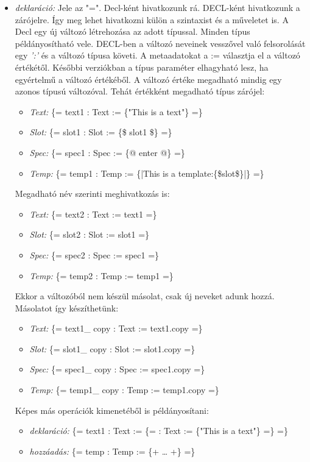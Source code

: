 \begin{itemize}
\item \emph{deklaráció:} 
Jele az "=".
Decl-ként hivatkozunk rá.
DECL-ként hivatkozunk a zárójelre.
Így meg lehet hivatkozni külön a szintaxist és a műveletet is.
A Decl egy új változó létrehozása az adott típussal.
Minden típus példányosítható vele.
DECL-ben a változó neveinek vesszővel való felsorolását egy \textit{':'} és a változó típusa követi. 
A metaadatokat a := választja el a változó értékétől.
Későbbi verziókban a típus paraméter elhagyható lesz, ha egyértelmű a változó értékéből. 
A változó értéke megadható mindig egy azonos típusú változóval.
Tehát értékként megadható típus zárójel:
\begin{itemize}
\item\emph{Text:} \{= text1 : Text := \{"This is a text"\} =\}
\item\emph{Slot:} \{= slot1 : Slot := \{\$ slot1 \$\} =\}
\item\emph{Spec:} \{= spec1 : Spec := \{@ enter @\} =\}
\item\emph{Temp:} \{= temp1 : Temp := \{|This is a template:\{\$slot\$\}|\} =\}
\end{itemize}
Megadható név szerinti meghivatkozás is:
\begin{itemize}
\item\emph{Text:} \{= text2 : Text := text1 =\}
\item\emph{Slot:} \{= slot2 : Slot := slot1 =\}
\item\emph{Spec:} \{= spec2 : Spec := spec1 =\}
\item\emph{Temp:} \{= temp2 : Temp := temp1 =\}
\end{itemize}
Ekkor a változóból nem készül másolat, csak új neveket adunk hozzá.
Másolatot így készíthetünk:
\begin{itemize}
\item\emph{Text:} \{= text1\_ copy : Text := text1.copy =\}
\item\emph{Slot:} \{= slot1\_ copy : Slot := slot1.copy =\}
\item\emph{Spec:} \{= spec1\_ copy : Spec := spec1.copy =\}
\item\emph{Temp:} \{= temp1\_ copy : Temp := temp1.copy =\}
\end{itemize}
Képes más operációk kimenetéből is példányosítani:
\begin{itemize}
\item\emph{deklaráció:} \{= text1 : Text := \{= : Text := \{"This is a text"\} =\} =\}
\item\emph{hozzáadás:} \{= temp : Temp := \{+ … +\} =\}

\end{itemize}
\end{itemize}
